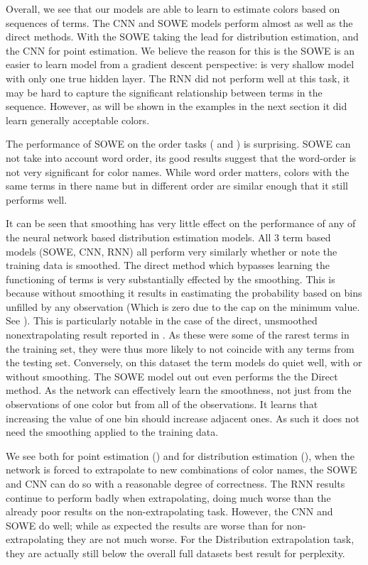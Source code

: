 \documentclass[11pt,a4paper]{article}
\begin{document}
Overall, we see that our models are able to learn to estimate colors based on sequences of terms.
The CNN and SOWE models perform almost as well as the direct methods.
With the SOWE taking the lead for distribution estimation, and the CNN for point estimation.
We believe the reason for this is the SOWE is an easier to learn model from a gradient descent perspective: is very shallow model with only one true hidden layer.
The RNN did not perform well at this task, it may be hard to capture the significant relationship between terms in the sequence.
However, as will be shown in the examples in the next section it did learn generally acceptable colors.


The performance of SOWE on the order tasks ( and ) is surprising.
SOWE can not take into account word order, its good results suggest that the word-order is not very significant for color names.
While word order matters, colors with the same terms in there name but in different order are similar enough that it still performs well.



It can be seen that smoothing has very little effect on the performance of any of the neural network based distribution estimation models.
All 3 term based models (SOWE, CNN, RNN) all perform very similarly whether or note the training data is smoothed.
The direct method which bypasses learning the functioning of terms is very substantially effected by the smoothing.
This is because without smoothing it results in eastimating the probability based on bins unfilled by any observation (Which is zero due to the cap on the minimum value. See ).
This is particularly notable in the case of the direct, unsmoothed nonextrapolating result reported in . As these were some of the rarest terms in the training set, they were thus more likely to not coincide with any terms from the testing set.
Conversely, on this dataset the term models do quiet well, with or without smoothing. The SOWE model out out even performs the the Direct method.
As the network can effectively learn the smoothness, not just from the observations of one color but from all of the observations.
It learns that increasing the value of one bin should increase adjacent ones.
As such it does not need the smoothing applied to the training data.

We see both for point estimation () and for distribution estimation (), when the network is forced to extrapolate to new combinations of color names, the SOWE and CNN can do so with a reasonable degree of correctness.
The RNN results continue to perform badly when extrapolating, doing much worse than the already poor results on the non-extrapolating task.
However, the CNN and SOWE do well; while as expected the results are worse than for non-extrapolating they are not much worse.
For the Distribution extrapolation task, they are actually still below the overall full datasets best result for perplexity.
\end{document}
